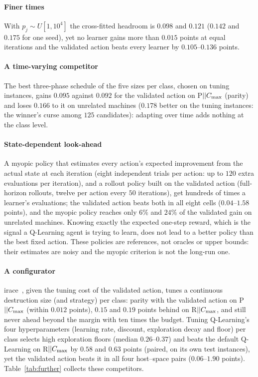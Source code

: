 \paragraph{Finer times} With $p_j\sim U[1,10^4]$ the cross-fitted headroom is $0.098$ and $0.121$ ($0.142$ and $0.175$ for one seed), yet no learner gains more than $0.015$ points at equal iterations and the validated action beats every learner by $0.105$--$0.136$ points.

\paragraph{A time-varying competitor} The best three-phase schedule of the five sizes per class, chosen on tuning instances, gains $0.095$ against $0.092$ for the validated action on P$||C_{\max}$ (parity) and loses $0.166$ to it on unrelated machines ($0.178$ better on the tuning instances: the winner's curse among $125$ candidates): adapting over time adds nothing at the class level.

\paragraph{State-dependent look-ahead} A myopic policy that estimates every action's expected improvement from the actual state at each iteration (eight independent trials per action: up to $120$ extra evaluations per iteration), and a rollout policy built on the validated action (full-horizon rollouts, twelve per action every $50$ iterations), get hundreds of times a learner's evaluations; the validated action beats both in all eight cells ($0.04$--$1.58$ points), and the myopic policy reaches only $6\%$ and $24\%$ of the validated gain on unrelated machines. Knowing exactly the expected one-step reward, which is the signal a Q-Learning agent is trying to learn, does not lead to a better policy than the best fixed action. These policies are references, not oracles or upper bounds: their estimates are noisy and the myopic criterion is not the long-run one.

\paragraph{A configurator} irace~\cite{LopezIbanezEtal2016}, given the tuning cost of the validated action, tunes a continuous destruction size (and strategy) per class: parity with the validated action on P$||C_{\max}$ (within $0.012$ points), $0.15$ and $0.19$ points behind on R$||C_{\max}$, and still never ahead beyond the margin with ten times the budget. Tuning Q-Learning's four hyperparameters (learning rate, discount, exploration decay and floor) per class selects high exploration floors (median $0.26$--$0.37$) and beats the default Q-Learning on R$||C_{\max}$ by $0.58$ and $0.63$ points (paired, on its own test instances), yet the validated action beats it in all four host--space pairs ($0.06$--$1.90$ points). Table~\ref{tab:further} collects these competitors.

